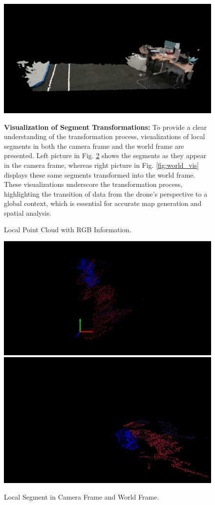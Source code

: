 \begin{figure}[H]
    \centering
    \includegraphics[width=.9\linewidth]{Pictures/mapping/vis_real.png}
    \caption{Local Point Cloud with RGB Information.}
    \label{fig:pc_real}

\textbf{Visualization of Segment Transformations:}
To provide a clear understanding of the transformation process, visualizations of local segments in both the camera frame and the world frame are presented. Left picture in Fig. \ref{fig:cam_vis} shows the segments as they appear in the camera frame, whereas right picture in Fig. \ref{fig:world_vis} displays these same segments transformed into the world frame. These visualizations underscore the transformation process, highlighting the transition of data from the drone's perspective to a global context, which is essential for accurate map generation and spatial analysis.

\end{figure}
\begin{figure}[H]
    \centering
    \includegraphics[width=.5\linewidth]{Pictures/mapping/vis_camframe.png}\hfill
    \includegraphics[width=.4\linewidth]{Pictures/mapping/vis_world.png}
    \caption{Local Segment in Camera Frame and World Frame.}
    \label{fig:cam_vis}
\end{figure}

